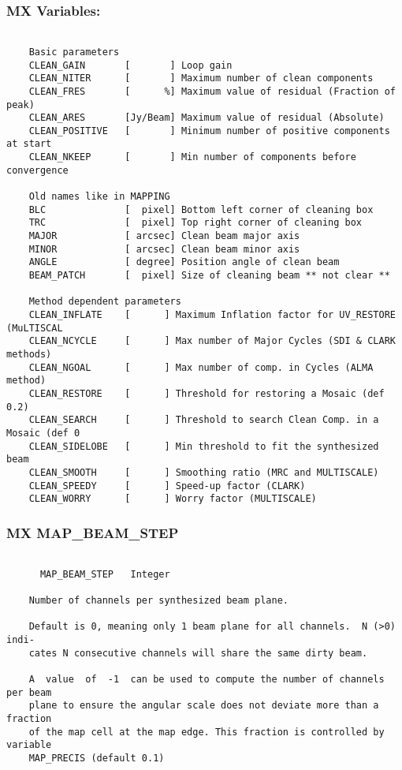 \subsubsection{MX Variables:}
\begin{verbatim}

    Basic parameters
    CLEAN_GAIN       [       ] Loop gain
    CLEAN_NITER      [       ] Maximum number of clean components
    CLEAN_FRES       [      %] Maximum value of residual (Fraction of peak)
    CLEAN_ARES       [Jy/Beam] Maximum value of residual (Absolute)
    CLEAN_POSITIVE   [       ] Minimum number of positive components at start
    CLEAN_NKEEP      [       ] Min number of components before convergence

    Old names like in MAPPING
    BLC              [  pixel] Bottom left corner of cleaning box
    TRC              [  pixel] Top right corner of cleaning box
    MAJOR            [ arcsec] Clean beam major axis
    MINOR            [ arcsec] Clean beam minor axis
    ANGLE            [ degree] Position angle of clean beam
    BEAM_PATCH       [  pixel] Size of cleaning beam ** not clear **

    Method dependent parameters
    CLEAN_INFLATE    [      ] Maximum Inflation factor for UV_RESTORE (MuLTISCAL
    CLEAN_NCYCLE     [      ] Max number of Major Cycles (SDI & CLARK methods)
    CLEAN_NGOAL      [      ] Max number of comp. in Cycles (ALMA method)
    CLEAN_RESTORE    [      ] Threshold for restoring a Mosaic (def 0.2)
    CLEAN_SEARCH     [      ] Threshold to search Clean Comp. in a Mosaic (def 0
    CLEAN_SIDELOBE   [      ] Min threshold to fit the synthesized beam
    CLEAN_SMOOTH     [      ] Smoothing ratio (MRC and MULTISCALE)
    CLEAN_SPEEDY     [      ] Speed-up factor (CLARK)
    CLEAN_WORRY      [      ] Worry factor (MULTISCALE)
\end{verbatim}
\subsubsection{MX MAP\_BEAM\_STEP}
\begin{verbatim}

      MAP_BEAM_STEP   Integer

    Number of channels per synthesized beam plane.

    Default is 0, meaning only 1 beam plane for all channels.  N (>0)  indi-
    cates N consecutive channels will share the same dirty beam.

    A  value  of  -1  can be used to compute the number of channels per beam
    plane to ensure the angular scale does not deviate more than a  fraction
    of the map cell at the map edge. This fraction is controlled by variable
    MAP_PRECIS (default 0.1)

\end{verbatim}
